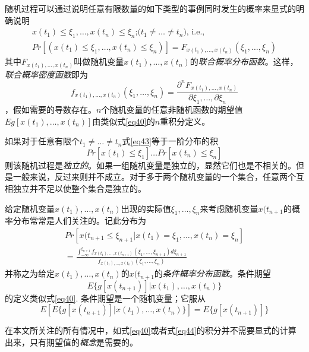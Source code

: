 \documentclass[UTF8,adobefonts]{ctexart}
\begin{document}
随机过程可以通过说明任意有限数量的如下类型的事例同时发生的概率来显式的明确说明
\begin{multline}
\label{eq43}
x(t_1) \le \xi_1,\dotsc,x(t_n) \le \xi_n \text{;}\text{(}t_1 \ne \dotsc \ne t_n \text{), i.e., }\\
Pr[(x(t_1) \le \xi_1, \dotsc, x(t_n) \le \xi_n)]=F_{x(t_1),\dotsc,x(t_n)}(\xi_1,\dotsc,\xi_n)
\end{multline}
其中$F_{x(t_1),\dotsc,x(t_n)}$叫做随机变量$x(t_1), \dotsc, x(t_n)$的\emph{联合概率分布函数}。这样，\emph{联合概率密度函数}即为
\begin{equation*}
f_{x(t_1),\dotsc,x(t_n)}(\xi_1,\dotsc,\xi_n)=\frac{\partial^n F_{x(t_1),\dotsc,x(t_n)}}{\partial\xi_1,\dotsc,\partial\xi_n}
\end{equation*}
，假如需要的导数存在。$n$个随机变量的任意非随机函数的期望值$Eg[x(t_1),\dotsc,x(t_n)]$由类似式\ref{eq40}的$n$重积分定义。

如果对于任意有限个$t_1 \ne \dotsc \ne t_n$式\ref{eq43}等于一阶分布的积
\begin{equation*}
Pr[x(t_1) \le \xi_1] \dotsc Pr[x(t_n) \le \xi_n]
\end{equation*}
则该随机过程是\emph{独立的}。如果一组随机变量是独立的，显然它们也是不相关的。但是一般来说，反过来则并不成立。对于多于两个随机变量的一个集合，任意两个互相独立并不足以使整个集合是独立的。

给定随机变量$x(t_1),\dotsc,x(t_n)$出现的实际值$\xi_1,\dotsc,\xi_n$来考虑随机变量$x(t_{n+1}$的概率分布常常是人们关注的。记此分布为
\begin{multline}
\label{eq44}
Pr[x(t_{n+1} \le \xi_{n+1} \vert x(t_1)=\xi_1,\dotsc,x(t_n)=\xi_n]\\
=\frac{\int^{\xi_{n+1}}_{-\infty}f_{x(t_1),\dotsc,x(t_{n+1})}(\xi_1,\dotsc,\xi_{n+1})d\xi_{n+1}}{f_{x(t_1),\dotsc,x(t_n)}(\xi_1,\dotsc,\xi_n)}
\end{multline}
并称之为给定$x(t_1),\dotsc,x(t_n)$的$x(t_{n+1}$的\emph{条件概率分布函数}。条件期望
\begin{equation*}
E\{g[x(t_{n+1})] \vert x(t_1),\dotsc,x(t_n)\}
\end{equation*}
的定义类似式\ref{eq40}. 条件期望是一个随机变量；它服从
\begin{equation*}
E[E\{g[x(t_{n+1})] \vert x(t_1),\dotsc,x(t_n)\}]=E\{g[x(t_{n+1})]\}
\end{equation*}

在本文所关注的所有情况中，如式\ref{eq40}或者式\ref{eq44}的积分并不需要显式的计算出来，只有期望值的\emph{概念}是需要的。
\end{document}
